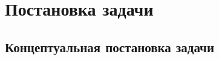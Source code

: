 \chapter{Постановка задачи}
\label{ch:task}


\section{Концептуальная постановка задачи}
\label{sec:abstract_task}


